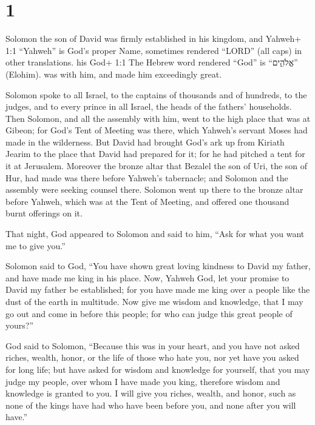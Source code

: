 \hypertarget{section}{%
\section{1}\label{section}}

 Solomon the son of David was firmly established in his
kingdom, and Yahweh+ 1:1 ``Yahweh'' is God's proper Name, sometimes
rendered ``LORD'' (all caps) in other translations. his God+ 1:1 The
Hebrew word rendered ``God'' is ``אֱלֹהִ֑ים'' (Elohim). was with him,
and made him exceedingly great.

 Solomon spoke to all Israel, to the captains of thousands
and of hundreds, to the judges, and to every prince in all Israel, the
heads of the fathers' households.  Then Solomon, and all the
assembly with him, went to the high place that was at Gibeon; for God's
Tent of Meeting was there, which Yahweh's servant Moses had made in the
wilderness.  But David had brought God's ark up from Kiriath
Jearim to the place that David had prepared for it; for he had pitched a
tent for it at Jerusalem.  Moreover the bronze altar that
Bezalel the son of Uri, the son of Hur, had made was there before
Yahweh's tabernacle; and Solomon and the assembly were seeking counsel
there.  Solomon went up there to the bronze altar before
Yahweh, which was at the Tent of Meeting, and offered one thousand burnt
offerings on it.

 That night, God appeared to Solomon and said to him, ``Ask
for what you want me to give you.''

 Solomon said to God, ``You have shown great loving kindness
to David my father, and have made me king in his place. 
Now, Yahweh God, let your promise to David my father be established; for
you have made me king over a people like the dust of the earth in
multitude.  Now give me wisdom and knowledge, that I may go
out and come in before this people; for who can judge this great people
of yours?''

 God said to Solomon, ``Because this was in your heart, and
you have not asked riches, wealth, honor, or the life of those who hate
you, nor yet have you asked for long life; but have asked for wisdom and
knowledge for yourself, that you may judge my people, over whom I have
made you king,  therefore wisdom and knowledge is granted
to you. I will give you riches, wealth, and honor, such as none of the
kings have had who have been before you, and none after you will have.''

